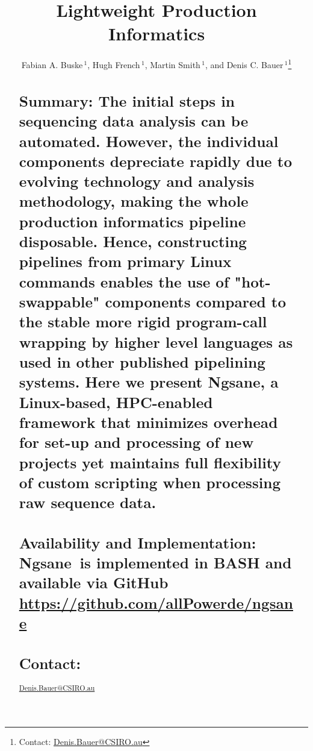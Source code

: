 \documentclass{bioinfo}
\newcommand{\prog}{{\sc Ngsane}}
\begin{document}

\title[NGSANE]{Lightweight Production Informatics}
\author[Fabian A. Buske {\em et al.}]{Fabian A. Buske\,$^{1}$,
Hugh French\,$^{1}$,
Martin Smith\,$^{1}$,
and  Denis C. Bauer\,$^{1}$\footnote{Contact: \href{Denis.Bauer@CSIRO.au}{Denis.Bauer@CSIRO.au}}}
\address{
          $^{1}$Epigenetics Program, Cancer Research Division, Garvan Institute of Medical Research, Kinghorn Cancer Centre, Darlinghurst City, NSW 2010, Australia,\\
          $^{2}$Division of Computational Informatics, CSIRO, Sydney, NSW. 2113 Australia,\\
          }



\maketitle


\begin{abstract}
\section{Summary: The initial steps in sequencing data analysis can be automated. However, the individual components depreciate rapidly due to evolving technology and analysis methodology, making the whole production informatics pipeline disposable.
Hence, constructing pipelines from primary Linux commands enables the use of "hot-swappable" components compared to the stable more rigid program-call wrapping by higher level languages as used in other published pipelining systems.
Here we present \prog , a Linux-based, HPC-enabled framework that minimizes overhead for set-up and processing of new projects yet maintains full flexibility of custom scripting when processing raw sequence data.}
\section{Availability and Implementation:  \prog\ is implemented in BASH and available via GitHub 
 \url{https://github.com/allPowerde/ngsane}}
\section{Contact:} \href{Denis.Bauer@CSIRO.au}{Denis.Bauer@CSIRO.au}
\end{abstract}
\end{document}
